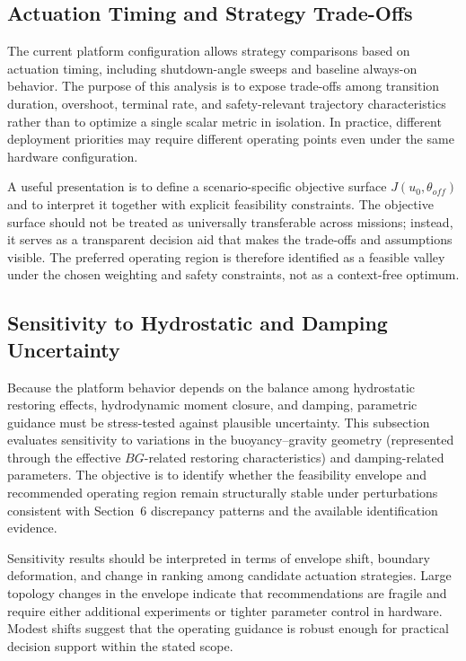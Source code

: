 
\subsection{Actuation Timing and Strategy Trade-Offs}

The current platform configuration allows strategy comparisons based on actuation timing, including shutdown-angle sweeps and baseline always-on behavior. The purpose of this analysis is to expose trade-offs among transition duration, overshoot, terminal rate, and safety-relevant trajectory characteristics rather than to optimize a single scalar metric in isolation. In practice, different deployment priorities may require different operating points even under the same hardware configuration.

A useful presentation is to define a scenario-specific objective surface $J(u_0,\theta_{off})$ and to interpret it together with explicit feasibility constraints. The objective surface should not be treated as universally transferable across missions; instead, it serves as a transparent decision aid that makes the trade-offs and assumptions visible. The preferred operating region is therefore identified as a feasible valley under the chosen weighting and safety constraints, not as a context-free optimum.


\subsection{Sensitivity to Hydrostatic and Damping Uncertainty}

Because the platform behavior depends on the balance among hydrostatic restoring effects, hydrodynamic moment closure, and damping, parametric guidance must be stress-tested against plausible uncertainty. This subsection evaluates sensitivity to variations in the buoyancy--gravity geometry (represented through the effective $BG$-related restoring characteristics) and damping-related parameters. The objective is to identify whether the feasibility envelope and recommended operating region remain structurally stable under perturbations consistent with Section~6 discrepancy patterns and the available identification evidence.

Sensitivity results should be interpreted in terms of envelope shift, boundary deformation, and change in ranking among candidate actuation strategies. Large topology changes in the envelope indicate that recommendations are fragile and require either additional experiments or tighter parameter control in hardware. Modest shifts suggest that the operating guidance is robust enough for practical decision support within the stated scope.

